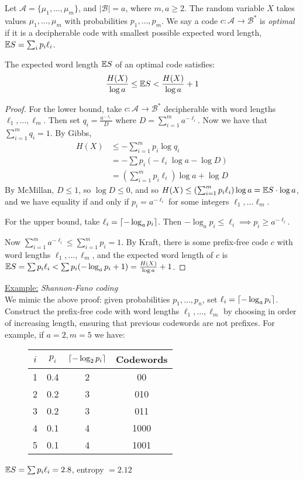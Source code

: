 \documentclass[10pt,a4paper]{article}
\begin{document}
Let $\mathcal{A} = \{\mu_1, \ldots, \mu_m\}$, and $|\mathcal{B}| = a$, where $m, a\geq 2$. The random variable $X$ takes values $\mu_1, \ldots, \mu_m$ with probabilities $p_1, \ldots, p_m$. We say a code $c:\mathcal{A} \to \mathcal{B}^{\ast}$ is \emph{optimal} if it is a decipherable code with smallest possible expected word length, $\mathbb{E} S = \sum_i p_i \ell_i$.

\begin{theorem}
The expected word length $\mathbb{E} S$ of an optimal code satisfies:
\begin{align*}
\frac{H(X)}{\log a} \leq \mathbb{E} S < \frac{H(X)}{\log a}+1
\end{align*}
\end{theorem}
\begin{proof}
For the lower bound, take $c: \mathcal{A} \to \mathcal{B}^{\ast}$ decipherable with word lengths $\ell_1, \ldots, \ell_m$. Then set $q_i = \frac{a^{-\ell_i}}{D}$ where $D = \sum_{i=1}^m a^{-\ell_i}$. Now we have that $\sum_{i=1}^m q_i = 1$. By Gibbs,
\begin{align*}
H(X) &\leq -\sum_{i=1}^m p_i \log q_i\\
&= -\sum p_i\left(-\ell_i \log a - \log D\right)\\
&= \left(\sum_{i=1}^m p_i \ell_i\right) \log a + \log D
\end{align*}
By McMillan, $D \leq 1$, so $\log D \leq 0$, and so $H(X) \leq \left(\sum_{i=1}^m p_i \ell_i\right) \log a = \mathbb{E} S \cdot \log a$, and we have equality if and only if $p_i = a^{-\ell_i}$ for some integers $\ell_1, \ldots \ell_m$.

For the upper bound, take $\ell_i = \lceil -\log_a p_i \rceil$. Then $-\log_a p_i \leq \ell_i \implies p_i \geq a^{-\ell_i}$.

Now $\sum_{i=1}^m a^{-\ell_i} \leq \sum_{i=1}^m p_i = 1$. By Kraft, there is some prefix-free code $c$ with word lengths $\ell_1, \ldots, \ell_m$, and the expected word length of $c$ is $\mathbb{E} S = \sum p_i \ell_i < \sum p_i (-\log_a p_i + 1) = \frac{H(X)}{\log a} + 1$.
\end{proof}

\hspace*{-1em}\underline{Example:} \emph{Shannon-Fano coding}\\
We mimic the above proof: given probabilities $p_1, \ldots, p_n$, set $\ell_i = \lceil -\log_a p_i \rceil$. Construct the prefix-free code with word lengths $\ell_1, \ldots, \ell_m$ by choosing in order of increasing length, ensuring that previous codewords are not prefixes. For example, if $a = 2, m = 5$ we have:\\
\begin{figure}[H]
\centering
\begin{tabular}{c|c|c|c}
$i$ & $p_i$ & $\lceil -\log_2 p_i \rceil$ & Codewords \\\hline
1 & 0.4 & 2 & 00 \\
2 & 0.2 & 3 & 010\\
3 & 0.2 & 3 & 011\\
4 & 0.1 & 4 & 1000\\
5 & 0.1 & 4 & 1001
\end{tabular}
\end{figure}
$\mathbb{E} S = \sum p_i \ell_i = 2.8$, entropy $= 2.12$
\end{document}
